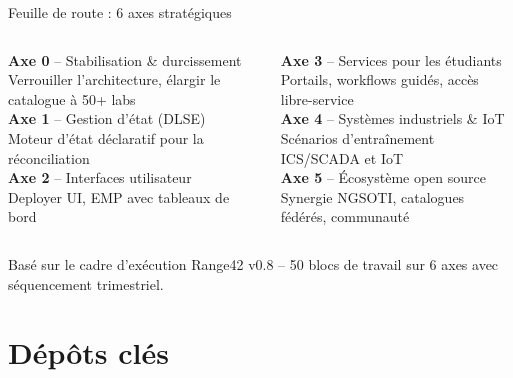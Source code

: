 \documentclass[aspectratio=169]{beamer}
\begin{document}
\begin{frame}{Feuille de route : 6 axes strat\'egiques \; \faRoad}
  \small
  \begin{columns}[T]
    \textbf{Axe 0} -- Stabilisation \& durcissement\\
    {\footnotesize Verrouiller l'architecture, \'elargir le catalogue \`a 50+ labs}\\[2mm]
    \textbf{Axe 1} -- Gestion d'\'etat (DLSE)\\
    {\footnotesize Moteur d'\'etat d\'eclaratif pour la r\'econciliation}\\[2mm]
    \textbf{Axe 2} -- Interfaces utilisateur\\
    {\footnotesize Deployer UI, EMP avec tableaux de bord}

    \textbf{Axe 3} -- Services pour les \'etudiants\\
    {\footnotesize Portails, workflows guid\'es, acc\`es libre-service}\\[2mm]
    \textbf{Axe 4} -- Syst\`emes industriels \& IoT\\
    {\footnotesize Sc\'enarios d'entra\^inement ICS/SCADA et IoT}\\[2mm]
    \textbf{Axe 5} -- \'Ecosyst\`eme open source\\
    {\footnotesize Synergie NGSOTI, catalogues f\'ed\'er\'es, communaut\'e}
  \end{columns}
  \vspace{3mm}
  \begin{tcolorbox}
    \faInfoCircle\; Bas\'e sur le cadre d'ex\'ecution Range42 v0.8 -- 50 blocs de travail sur 6 axes avec s\'equencement trimestriel.
  \end{tcolorbox}
\end{frame}

\section{D\'ep\^ots cl\'es}
\end{document}
